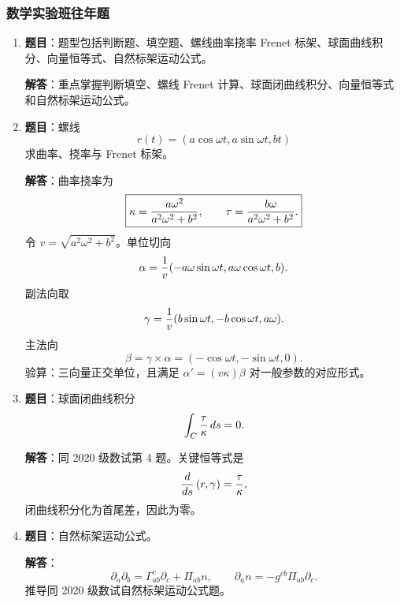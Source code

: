 \documentclass[UTF8,12pt,a4paper]{ctexart}
\newcommand{\inner}[2]{\left(#1,#2\right)}
\begin{document}
\subsubsection{数学实验班往年题}
\begin{enumerate}
\item \textbf{题目}：题型包括判断题、填空题、螺线曲率挠率 Frenet 标架、球面曲线积分、向量恒等式、自然标架运动公式。

\textbf{解答}：重点掌握判断填空、螺线 Frenet 计算、球面闭曲线积分、向量恒等式和自然标架运动公式。

\item \textbf{题目}：螺线
\[
r(t)=(a\cos\omega t,a\sin\omega t,bt)
\]
求曲率、挠率与 Frenet 标架。

\textbf{解答}：曲率挠率为
\[
\boxed{\kappa={a\omega^2\over a^2\omega^2+b^2},\qquad
\tau={b\omega\over a^2\omega^2+b^2}.}
\]
令 $v=\sqrt{a^2\omega^2+b^2}$。单位切向
\[
\alpha={1\over v}(-a\omega\sin\omega t,a\omega\cos\omega t,b).
\]
副法向取
\[
\gamma={1\over v}(b\sin\omega t,-b\cos\omega t,a\omega).
\]
主法向
\[
\beta=\gamma\times\alpha=(-\cos\omega t,-\sin\omega t,0).
\]
验算：三向量正交单位，且满足 $\alpha'=(v\kappa)\beta$ 对一般参数的对应形式。

\item \textbf{题目}：球面闭曲线积分
\[
\int_C{\tau\over\kappa}\,ds=0.
\]

\textbf{解答}：同 2020 级数试第 4 题。关键恒等式是
\[
{d\over ds}\inner{r}{\gamma}={\tau\over\kappa},
\]
闭曲线积分化为首尾差，因此为零。

\item \textbf{题目}：自然标架运动公式。

\textbf{解答}：
\[
\boxed{\partial_a\partial_b=\Gamma^c_{ab}\partial_c+\Pi_{ab}n,\qquad
\partial_an=-g^{cb}\Pi_{ab}\partial_c.}
\]
推导同 2020 级数试自然标架运动公式题。
\end{enumerate}
\end{document}
